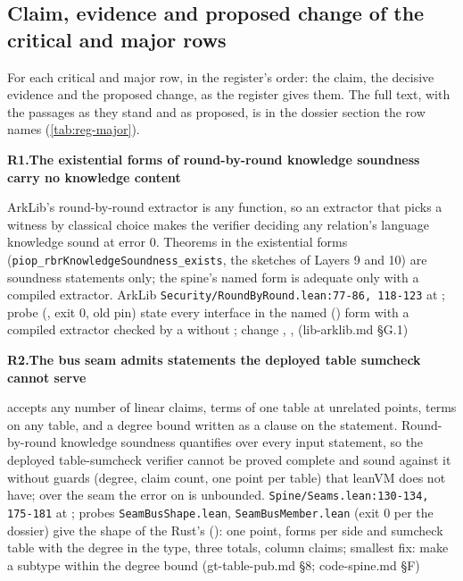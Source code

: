 \subsection{Claim, evidence and proposed change of the critical and major rows}\label{sec:reg-claims}

For each critical and major row, in the register's order: the claim, the decisive evidence and the proposed change, as the register gives them. The full text, with the passages as they stand and as proposed, is in the dossier section the row names (\cref{tab:reg-major}).

\begingroup\sloppy
\par\medskip\noindent\textbf{R1.}\enspace\textbf{The existential forms of round-by-round knowledge soundness carry no knowledge content}\par\nopagebreak
{} ArkLib's round-by-round extractor is any function, so an extractor that picks a witness by classical choice makes the verifier deciding any relation's language knowledge sound at error 0. Theorems in the existential forms (\texttt{piop\_\allowbreak{}rbr\allowbreak{}Knowledge\allowbreak{}Soundness\_\allowbreak{}exists}, the sketches of Layers 9 and 10) are soundness statements only; the spine's named form is adequate only with a compiled extractor.
 ArkLib \texttt{Security/\allowbreak{}Round\allowbreak{}By\allowbreak{}Round.\allowbreak{}lean:\allowbreak{}77-\allowbreak{}86,\allowbreak{} 118-\allowbreak{}123} at ; probe  (, exit 0, old pin)
 state every interface in the named () form with a compiled extractor checked by a  without ; change , ,  (lib-arklib.md §G.1)

\par\medskip\noindent\textbf{R2.}\enspace\textbf{The bus seam admits statements the deployed table sumcheck cannot serve}\par\nopagebreak
{}  accepts any number of linear claims, terms of one table at unrelated points, terms on any table, and a degree bound written as a clause on the statement. Round-by-round knowledge soundness quantifies over every input statement, so the deployed table-sumcheck verifier cannot be proved complete and sound against it without guards (degree, claim count, one point per table) that leanVM does not have; over the seam the error on  is unbounded.
 \texttt{Spine/\allowbreak{}Seams.\allowbreak{}lean:\allowbreak{}130-\allowbreak{}134,\allowbreak{} 175-\allowbreak{}181} at ; probes \texttt{Seam\allowbreak{}Bus\allowbreak{}Shape.\allowbreak{}lean}, \texttt{Seam\allowbreak{}Bus\allowbreak{}Member.\allowbreak{}lean} (exit 0 per the dossier)
 give  the shape of the Rust's  (): one point, forms per side and sumcheck table with the degree in the type, three totals, column claims; smallest fix: make  a subtype within the degree bound (gt-table-pub.md §8; code-spine.md §F)

